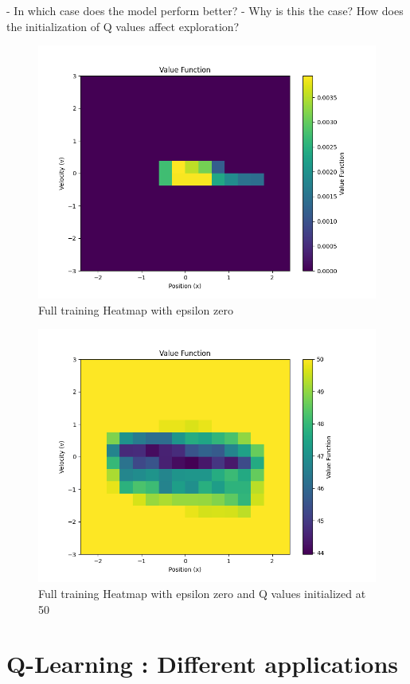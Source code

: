 \documentclass{article}
\begin{document}
- In which case does the model perform better?
- Why is this the case? How does the initialization of Q values aﬀect exploration?

\begin{figure}[h]
	\centering
	\includegraphics[width=0.5\linewidth]{../data/plot/heatmap_full_training_zero_epsilon.png}
	\caption{Full training Heatmap with epsilon zero}
	\label{fig:heatmap_zero}
\end{figure}

\begin{figure}[h]
	\centering
	\includegraphics[width=0.5\linewidth]{../data/plot/heatmap_full_training_zero_epsilon_fifty_initial.png}
	\caption{Full training Heatmap with epsilon zero and Q values initialized at 50}
	\label{fig:heatmap_zero}
\end{figure}

\newpage

\section{Q-Learning : Different applications}
\end{document}
